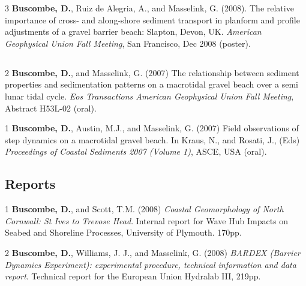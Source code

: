 \documentclass[margin,line]{resume}
\begin{document}
\begin{resume}
\begin{footnotesize}
\begin{list1}
	\item[3] {\bf Buscombe, D.}, Ruiz de Alegria, A., and Masselink, G. (2008). The relative importance of cross- and along-shore sediment transport in planform and profile adjustments of a gravel barrier beach: Slapton, Devon, UK. {\sl American Geophysical Union Fall Meeting}, San Francisco, Dec 2008 (poster).
	\end{list1}
	
	\subsection{}

	\begin{list1}
	\item[2] {\bf Buscombe, D.}, and Masselink, G. (2007) The relationship between sediment properties and sedimentation patterns on a macrotidal gravel beach over a semi lunar tidal cycle. {\sl Eos Transactions American Geophysical Union Fall Meeting}, Abstract H53L-02 (oral).\\
	
	\item[1] {\bf Buscombe, D.}, Austin, M.J., and Masselink, G. (2007) Field observations of step dynamics on a macrotidal gravel beach. In Kraus, N., and Rosati, J., (Eds) {\sl Proceedings of Coastal Sediments 2007 (Volume 1)}, ASCE, USA (oral).
	
	\end{list1}
	
	        \end{footnotesize}

	\subsection{\mysidestyle Reports}
        \begin{footnotesize}
	\begin{list1}
	 
	\item[1] {\bf Buscombe, D.}, and Scott, T.M. (2008) {\sl Coastal Geomorphology of North Cornwall: St Ives to Trevose Head}. Internal report for Wave Hub Impacts on Seabed and Shoreline Processes, University of Plymouth. 170pp.\\
	\item[2] {\bf Buscombe, D.}, Williams, J. J., and Masselink, G. (2008) {\sl BARDEX (Barrier Dynamics Experiment): experimental procedure, technical information and data report}. Technical report for the European Union Hydralab III, 219pp. 


\end{list1}
\end{footnotesize}
\end{resume}
\end{document}
